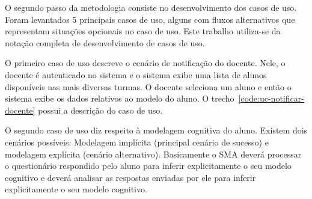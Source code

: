 O segundo passo da metodologia consiste no desenvolvimento dos casos de uso. Foram levantados 5 principais casos de uso, alguns com fluxos alternativos que representam situações opcionais no caso de uso. Este trabalho utiliza-se da notação completa de desenvolvimento de casos de uso.

O primeiro caso de uso descreve o cenário de notificação do docente. Nele, o docente é autenticado no sistema e o sistema exibe uma lista de alunos disponíveis nas mais diversas turmas. O docente seleciona um aluno e então o sistema exibe os dados relativos ao modelo do aluno. O trecho~\ref{code:uc-notificar-docente} possui a descrição do caso de uso.

\label{code:uc-notificar-docente}


O segundo caso de uso diz respeito à modelagem cognitiva do aluno. Existem dois cenários possíveis: Modelagem implícita (principal cenário de sucesso) e modelagem explícita (cenário alternativo). Basicamente o SMA deverá processar o questionário respondido pelo aluno para inferir explicitamente o seu modelo cognitivo e deverá analisar as respostas enviadas por ele para inferir explicitamente o seu modelo cognitivo.



